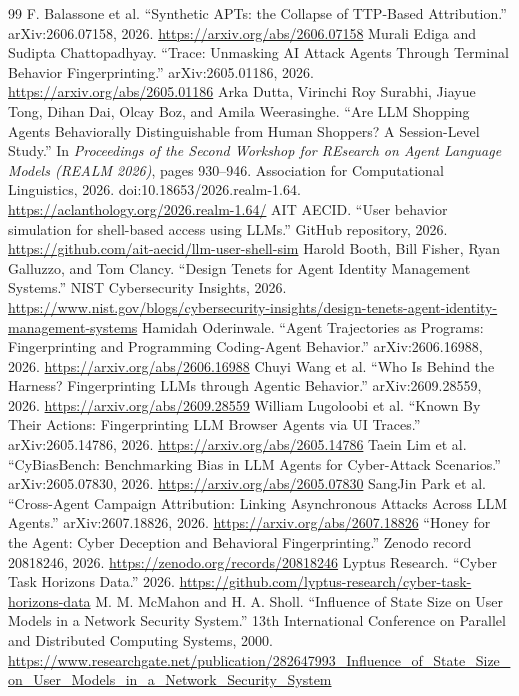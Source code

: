 \documentclass[10pt]{article}
\begin{document}
\begin{thebibliography}{99}
 F. Balassone et al. ``Synthetic APTs: the Collapse of TTP-Based Attribution.'' arXiv:2606.07158, 2026. \url{https://arxiv.org/abs/2606.07158}
 Murali Ediga and Sudipta Chattopadhyay. ``Trace: Unmasking AI Attack Agents Through Terminal Behavior Fingerprinting.'' arXiv:2605.01186, 2026. \url{https://arxiv.org/abs/2605.01186}
 Arka Dutta, Virinchi Roy Surabhi, Jiayue Tong, Dihan Dai, Olcay Boz, and Amila Weerasinghe. ``Are LLM Shopping Agents Behaviorally Distinguishable from Human Shoppers? A Session-Level Study.'' In \emph{Proceedings of the Second Workshop for REsearch on Agent Language Models (REALM 2026)}, pages 930--946. Association for Computational Linguistics, 2026. doi:10.18653/2026.realm-1.64. \url{https://aclanthology.org/2026.realm-1.64/}
 AIT AECID. ``User behavior simulation for shell-based access using LLMs.'' GitHub repository, 2026. \url{https://github.com/ait-aecid/llm-user-shell-sim}
 Harold Booth, Bill Fisher, Ryan Galluzzo, and Tom Clancy. ``Design Tenets for Agent Identity Management Systems.'' NIST Cybersecurity Insights, 2026. \url{https://www.nist.gov/blogs/cybersecurity-insights/design-tenets-agent-identity-management-systems}
 Hamidah Oderinwale. ``Agent Trajectories as Programs: Fingerprinting and Programming Coding-Agent Behavior.'' arXiv:2606.16988, 2026. \url{https://arxiv.org/abs/2606.16988}
 Chuyi Wang et al. ``Who Is Behind the Harness? Fingerprinting LLMs through Agentic Behavior.'' arXiv:2609.28559, 2026. \url{https://arxiv.org/abs/2609.28559}
 William Lugoloobi et al. ``Known By Their Actions: Fingerprinting LLM Browser Agents via UI Traces.'' arXiv:2605.14786, 2026. \url{https://arxiv.org/abs/2605.14786}
 Taein Lim et al. ``CyBiasBench: Benchmarking Bias in LLM Agents for Cyber-Attack Scenarios.'' arXiv:2605.07830, 2026. \url{https://arxiv.org/abs/2605.07830}
 SangJin Park et al. ``Cross-Agent Campaign Attribution: Linking Asynchronous Attacks Across LLM Agents.'' arXiv:2607.18826, 2026. \url{https://arxiv.org/abs/2607.18826}
 ``Honey for the Agent: Cyber Deception and Behavioral Fingerprinting.'' Zenodo record 20818246, 2026. \url{https://zenodo.org/records/20818246}
 Lyptus Research. ``Cyber Task Horizons Data.'' 2026. \url{https://github.com/lyptus-research/cyber-task-horizons-data}
 M. M. McMahon and H. A. Sholl. ``Influence of State Size on User Models in a Network Security System.'' 13th International Conference on Parallel and Distributed Computing Systems, 2000. \url{https://www.researchgate.net/publication/282647993_Influence_of_State_Size_on_User_Models_in_a_Network_Security_System}

\end{thebibliography}
\end{document}
